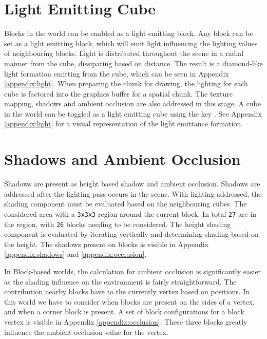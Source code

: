 \documentclass{book}
\begin{document}
\section{Light Emitting Cube}
Blocks in the world can be enabled as a light emitting block.  Any block can be set as a light emitting block, which will emit light influencing the lighting values of neighbouring blocks.  Light is distributed throughout the scene in a radial manner from the cube, dissipating based on distance.  The result is a diamond-like light formation emitting from the cube, which can be seen in Appendix \ref{appendix:light}.  When preparing the chunk for drawing, the lighting for each cube is factored into the graphics buffer for a spatial chunk.  The texture mapping, shadows and ambient occlusion are also addressed in this stage.  
\vskip 2.5mm\noindent
A cube in the world can be toggled as a light emitting cube using the key .  See Appendix \ref{appendix:light} for a visual representation of the light emittance formation.
    
\section{Shadows and Ambient Occlusion}
Shadows are present as height based shadow and ambient occlusion.  Shadows are addressed after the lighting pass occurs in the scene.  With lighting addressed, the shading component must be evaluated based on the neighbouring cubes.  The considered area with a \texttt{3x3x3} region around the current block.  In total \texttt{27} are in the region, with \texttt{26} blocks needing to be considered.  The height shading component is evaluated by iterating vertically and determining shading based on the height.  The shadows present on blocks is visible in Appendix \ref{appendix:shadows} and \ref{appendix:occlusion}.

In Block-based worlds, the calculation for ambient occlusion is significantly easier as the shading influence on the environment is fairly straightforward.  The contribution nearby blocks have to the currently vertex based on positions.  In this world we have to consider when blocks are present on the sides of a vertex, and when a corner block is present.  A set of block configurations for a block vertex is visible in Appendix \ref{appendix:occlusion}.  These three blocks greatly influence the ambient occlusion value for the vertex.

\end{document}
